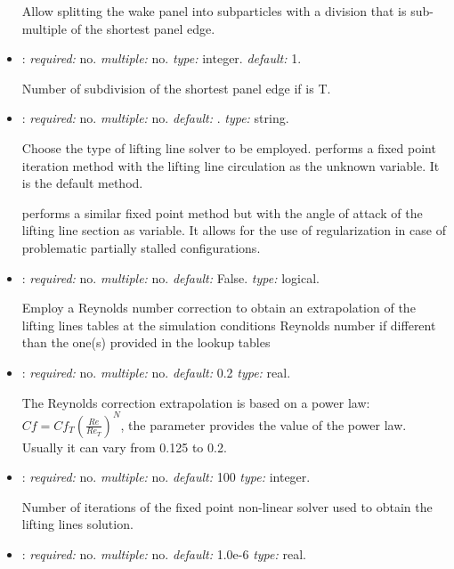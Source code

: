 \begin{itemize}
Allow splitting the wake panel into subparticles with a division that is sub-multiple of the shortest panel edge.   

\item {}: \textit{required:} no. \textit{multiple:} no. \textit{type:} integer. \textit{default:} 1. 

Number of subdivision of the shortest panel edge if  is T. 

\item {}: \textit{required:} no. \textit{multiple:} no. 
\textit{default:} . \textit{type:} string.

Choose the type of lifting line solver to be employed. 
 performs a fixed point iteration method with the lifting 
line circulation as the unknown variable. It is the default method. 

 performs a similar fixed point method but with the angle 
of attack of the lifting line section as variable. 
It allows for the use of regularization in case of problematic 
partially stalled configurations. 

\item {}: \textit{required:} no. 
\textit{multiple:} no. \textit{default:} False. \textit{type:} logical.

Employ a Reynolds number correction to obtain an extrapolation of 
the lifting lines tables at the simulation conditions Reynolds number 
if different than the one(s) provided in the lookup tables

\item {}: \textit{required:} no. 
\textit{multiple:} no. \textit{default:} 0.2 \textit{type:} real.

The Reynolds correction extrapolation is based on a power law: 
$Cf = Cf_T \left(\frac{Re}{Re_T}\right)^N$, the parameter provides the 
value of the power law. Usually it can vary from 0.125 to 0.2.

\item {}: \textit{required:} no. \textit{multiple:} no. 
\textit{default:} 100 \textit{type:} integer.

Number of iterations of the fixed point non-linear solver used to obtain 
the lifting lines solution.

\item {}: \textit{required:} no. \textit{multiple:} no. 
\textit{default:} 1.0e-6 \textit{type:} real.


\end{itemize}
